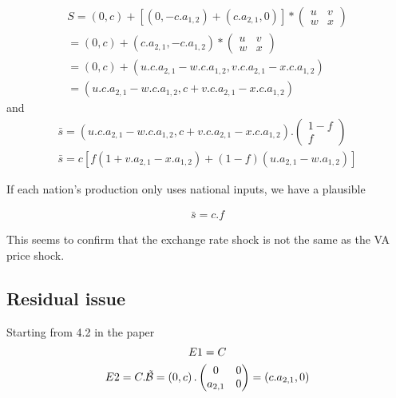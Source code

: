 \documentclass[11pt,a4paper]{article}
\begin{document}
\begin{gather*}
S =\left(0,c\right)+\left[\left(0,-c.a_{1,2}\right)+\left(c.a_{2,1},0\right)\right]*\left(\begin{matrix}u&v\\w&x\end{matrix}\right)
\\
=\left(0,c\right)+\left(c.a_{2,1},-c.a_{1,2}\right)*\left(\begin{matrix}u&v\\w&x\end{matrix}\right)
\\
=\left(0,c\right)+\left(u.c.a_{2,1}-w.c.a_{1,2},v.c.a_{2,1}-x.c.a_{1,2}\right)
\\
=\left(u.c.a_{2,1}-w.c.a_{1,2},c+v.c.a_{2,1}-x.c.a_{1,2}\right)
\end{gather*}
and
\begin{gather*}
\bar{s}=\left(u.c.a_{2,1}-w.c.a_{1,2},c+v.c.a_{2,1}-x.c.a_{1,2}\right).\left(\begin{matrix}1-f\\f\end{matrix}\right)
\\
\bar{s}=c\left[f\left(1+v.a_{2,1}-x.a_{1,2}\right)+\left(1-f\right)\left(u.a_{2,1}-w.a_{1,2}\right)\right]
\end{gather*}


If each nation's production only uses national inputs, we have a plausible

\begin{gather*}
\bar{s}=c.f
\end{gather*}

This seems to confirm that the exchange rate shock is not the same as the VA price shock.

\subsection{Residual issue}

Starting from 4.2 in the paper
\begin{gather*}
E1=C
\\
E2=C.\tilde{\cal B}=\left(0,c\right).\left(\begin{matrix}0&0\\a_{2,1}&0\end{matrix}\right)=\left(c.a_{2,1},0\right)
\end{gather*}
\end{document}
